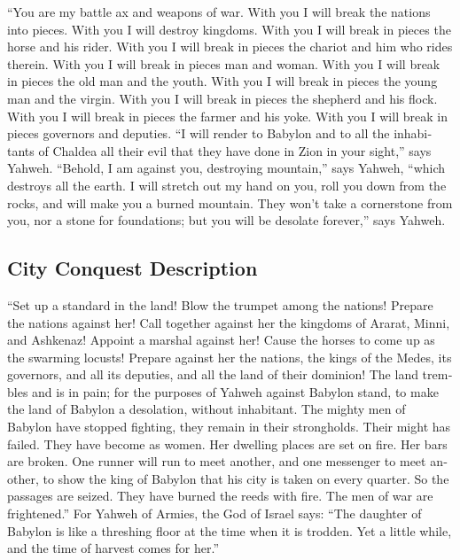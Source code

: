 \begin{paracol}{2}
\begin{otherlanguage}{english}
 ``You are my battle ax and weapons of war. With you I
will break the nations into pieces. With you I will destroy kingdoms.
 With you I will break in pieces the horse and his rider.
 With you I will break in pieces the chariot and him who
rides therein. With you I will break in pieces man and woman. With you I
will break in pieces the old man and the youth. With you I will break in
pieces the young man and the virgin.  With you I will
break in pieces the shepherd and his flock. With you I will break in
pieces the farmer and his yoke. With you I will break in pieces
governors and deputies.  ``I will render to Babylon and
to all the inhabitants of Chaldea all their evil that they have done in
Zion in your sight,'' says Yahweh.  ``Behold, I am
against you, destroying mountain,'' says Yahweh, ``which destroys all
the earth. I will stretch out my hand on you, roll you down from the
rocks, and will make you a burned mountain.  They won't
take a cornerstone from you, nor a stone for foundations; but you will
be desolate forever,'' says Yahweh.

\hypertarget{city-conquest-description}{%
\subsection{City Conquest Description}\label{city-conquest-description}}

 ``Set up a standard in the land! Blow the trumpet among
the nations! Prepare the nations against her! Call together against her
the kingdoms of Ararat, Minni, and Ashkenaz! Appoint a marshal against
her! Cause the horses to come up as the swarming locusts!
 Prepare against her the nations, the kings of the Medes,
its governors, and all its deputies, and all the land of their dominion!
 The land trembles and is in pain; for the purposes of
Yahweh against Babylon stand, to make the land of Babylon a desolation,
without inhabitant.  The mighty men of Babylon have
stopped fighting, they remain in their strongholds. Their might has
failed. They have become as women. Her dwelling places are set on fire.
Her bars are broken.  One runner will run to meet
another, and one messenger to meet another, to show the king of Babylon
that his city is taken on every quarter.  So the passages
are seized. They have burned the reeds with fire. The men of war are
frightened.''  For Yahweh of Armies, the God of Israel
says: ``The daughter of Babylon is like a threshing floor at the time
when it is trodden. Yet a little while, and the time of harvest comes
for her.''


\end{otherlanguage}
\end{paracol}
